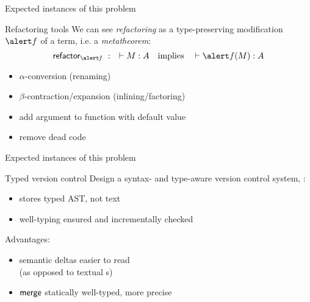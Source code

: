 \documentclass{beamer}
\theoremstyle{example}
\begin{document}
\begin{frame}{Expected instances of this problem}
  \begin{block}{Refactoring tools}
    We can see \emph{refactoring} as a type-preserving modification
    $\alert f$ of a term, i.e. a \emph{metatheorem}:
    $$ \funname{refactor_{\mathit{\alert f}}}\ :\quad \vdash M : A \quad\text{implies}\quad \vdash \alert f(M) : A $$
  \end{block}
  \begin{examples}
    \begin{itemize}
    \item $\alpha$-conversion (renaming)
    \item $\beta$-contraction/expansion (inlining/factoring)
    \item add argument to function with default value
    \item remove dead code
    \end{itemize}
  \end{examples}
\end{frame}

\begin{frame}{Expected instances of this problem}
  \begin{block}{Typed version control}
    Design a syntax- and type-aware version control system, \ie:

    \begin{itemize}
    \item stores typed AST, not text
    \item well-typing ensured and incrementally checked
    \end{itemize}

    Advantages:
    \begin{itemize}
    \item semantic deltas easier to read\\
      {\small (as opposed to textual s)}
    \item ${\rm\mathsf{merge}}$ statically well-typed, more precise
    \end{itemize}
  \end{block}
\end{frame}
\end{document}
